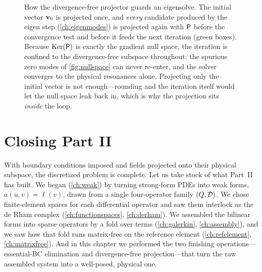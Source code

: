 \begin{figure}[t]
\centering
{}
\caption[The projector inside the eigenvalue loop]{How the divergence-free
projector guards an eigensolve. The initial vector $\mathbf{v}_0$ is projected once, and
\emph{every} candidate produced by the eigen step (\cref{ch:eigenmodes}) is
projected again with $\mathsf{P}$ before the convergence test and before it feeds the
next iteration (green boxes). Because $\mathrm{Ker}(\mathsf{P})$ is exactly the
gradient null space, the iteration is confined to the divergence-free subspace
throughout: the spurious zero modes of \cref{fig:nullspace} can never re-enter, and
the solver converges to the physical resonances alone. Projecting only the initial
vector is not enough---rounding and the iteration itself would let the null space
leak back in, which is why the projection sits \emph{inside} the loop.}
\label{fig:eigproj}
\end{figure}

\section{Closing Part II}

With boundary conditions imposed and fields projected onto their physical
subspace, the discretized problem is complete. Let us take stock of what Part~II
has built. We began (\cref{ch:weak}) by turning strong-form PDEs into weak forms,
$a(u,v)=\ell(v)$, drawn from a single four-operator family
$(Q,\mathcal{D})$. We chose finite-element spaces for each differential operator and
saw them interlock as the de Rham complex (\cref{ch:functionspaces},
\cref{ch:derham}). We assembled the bilinear forms into sparse operators by a fold
over terms (\cref{ch:galerkin}, \cref{ch:assembly}), and we saw how that fold
runs matrix-free on the reference element (\cref{ch:refelement},
\cref{ch:matrixfree}). And in this chapter we performed the two finishing
operations---essential-BC elimination and divergence-free projection---that turn
the raw assembled system into a well-posed, physical one.

